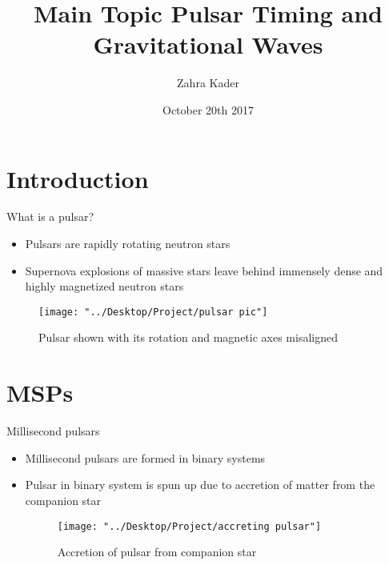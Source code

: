 \documentclass{beamer}
\title[Short title]{Main Topic } %
\title[Your Short Title]{Pulsar Timing and Gravitational Waves}
\author{Zahra Kader}
\date{October 20th 2017}
\begin{document}
	
	\begin{frame}
	\titlepage
\end{frame}


\section{Introduction}

\begin{frame}{What is a pulsar?}

\begin{itemize}
	\item Pulsars are rapidly rotating neutron stars
	\item Supernova explosions of massive stars leave behind immensely dense and highly magnetized neutron stars
\end{itemize}
\begin{figure}
	\centering
	\texttt{[image: "../Desktop/Project/pulsar pic"]}
	\caption{Pulsar shown with its rotation and magnetic axes misaligned}
	\label{fig:pulsar-pic}
\end{figure}
\end{frame}


\section{MSPs}

\begin{frame}{Millisecond pulsars}

\begin{itemize}
\item Millisecond pulsars are formed in binary systems
\item Pulsar in binary system is spun up due to accretion of matter from the companion star
\begin{figure}
	\centering
	\texttt{[image: "../Desktop/Project/accreting pulsar"]}
	\caption{Accretion of pulsar from companion star}
	\label{fig:accreting-pulsar}
\end{figure}
\end{itemize}

\end{frame}
\end{document}
